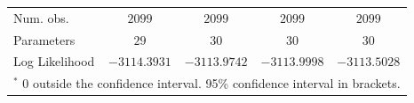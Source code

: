 \documentclass[shortAfour,sageh.bst]{sagej}
\begin{document}
\begin{table}
\begin{center}
{\begin{tabular}{l c c c c}
\midrule
Num. obs.                           & $2099$                & $2099$                & $2099$                & $2099$                \\
Parameters                          & $29$                  & $30$                  & $30$                  & $30$                  \\
Log Likelihood                      & $-3114.3931$          & $-3113.9742$          & $-3113.9998$          & $-3113.5028$          \\
\bottomrule
\multicolumn{5}{l}{\scriptsize{$^*$ 0 outside the confidence interval. 95\% confidence interval in brackets.}}
\end{tabular}
}\end{center}
\end{table}
\end{document}
